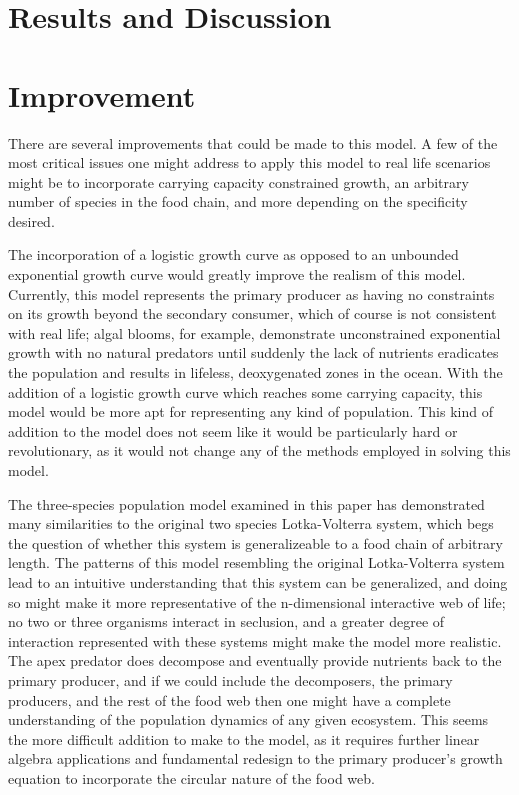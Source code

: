 \documentclass[11pt,oneside]{article}
\begin{document}
	\section{Results and Discussion}
	
	\section{Improvement}
	There are several improvements that could be made to this model. A few of the most critical issues one might address to apply this model to real life scenarios might be to incorporate carrying capacity constrained growth, an arbitrary number of species in the food chain, and more depending on the specificity desired.
	
	The incorporation of a logistic growth curve as opposed to an unbounded exponential growth curve would greatly improve the realism of this model. Currently, this model represents the primary producer as having no constraints on its growth beyond the secondary consumer, which of course is not consistent with real life; algal blooms, for example, demonstrate unconstrained exponential growth with no natural predators until suddenly the lack of nutrients eradicates the population and results in lifeless, deoxygenated zones in the ocean. With the addition of a logistic growth curve which reaches some carrying capacity, this model would be more apt for representing any kind of population. This kind of addition to the model does not seem like it would be particularly hard or revolutionary, as it would not change any of the methods employed in solving this model.
	
	The three-species population model examined in this paper has demonstrated many similarities to the original two species Lotka-Volterra system, which begs the question of whether this system is generalizeable to a food chain of arbitrary length. The patterns of this model resembling the original Lotka-Volterra system lead to an intuitive understanding that this system can be generalized, and doing so might make it more representative of the n-dimensional interactive web of life; no two or three organisms interact in seclusion, and a greater degree of interaction represented with these systems might make the model more realistic. The apex predator does decompose and eventually provide nutrients back to the primary producer, and if we could include the decomposers, the primary producers, and the rest of the food web then one might have a complete understanding of the population dynamics of any given ecosystem. This seems the more difficult addition to make to the model, as it requires further linear algebra applications and fundamental redesign to the primary producer's growth equation to incorporate the circular nature of the food web.
	
\end{document}
